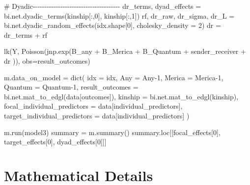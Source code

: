 \documentclass[
  letterpaper,
  DIV=11,
  numbers=noendperiod]{scrreprt}
\newenvironment{Shaded}{\begin{snugshade}}{\end{snugshade}}
\newcommand{\BuiltInTok}[1]{\textcolor[rgb]{0.00,0.23,0.31}{#1}}
\newcommand{\CommentTok}[1]{\textcolor[rgb]{0.37,0.37,0.37}{#1}}
\newcommand{\DecValTok}[1]{\textcolor[rgb]{0.68,0.00,0.00}{#1}}
\newcommand{\NormalTok}[1]{\textcolor[rgb]{0.00,0.23,0.31}{#1}}
\newcommand{\OperatorTok}[1]{\textcolor[rgb]{0.37,0.37,0.37}{#1}}
\newcommand{\StringTok}[1]{\textcolor[rgb]{0.13,0.47,0.30}{#1}}
\begin{document}
\begin{Shaded}
\begin{Highlighting}[]
    \CommentTok{\# Dyadic{-}{-}{-}{-}{-}{-}{-}{-}{-}{-}{-}{-}{-}{-}{-}{-}{-}{-}{-}{-}{-}{-}{-}{-}{-}{-}{-}{-}{-}{-}{-}{-}{-}{-}{-}{-}{-}{-}  }
\NormalTok{    dr\_terms, dyad\_effects }\OperatorTok{=}\NormalTok{ bi.net.dyadic\_terms(kinship[:,}\DecValTok{0}\NormalTok{], kinship[:,}\DecValTok{1}\NormalTok{])}
\NormalTok{    rf, dr\_raw, dr\_sigma, dr\_L }\OperatorTok{=}\NormalTok{ bi.net.dyadic\_random\_effects(idx.shape[}\DecValTok{0}\NormalTok{], cholesky\_density }\OperatorTok{=} \DecValTok{2}\NormalTok{)}
\NormalTok{    dr }\OperatorTok{=}\NormalTok{ dr\_terms }\OperatorTok{+}\NormalTok{ rf}

\NormalTok{    lk(}\StringTok{\textquotesingle{}Y\textquotesingle{}}\NormalTok{, Poisson(jnp.exp(B\_any }\OperatorTok{+}\NormalTok{ B\_Merica }\OperatorTok{+}\NormalTok{ B\_Quantum }\OperatorTok{+}\NormalTok{ sender\_receiver }\OperatorTok{+}\NormalTok{ dr )), obs}\OperatorTok{=}\NormalTok{result\_outcomes)}

\NormalTok{m.data\_on\_model }\OperatorTok{=} \BuiltInTok{dict}\NormalTok{(}
\NormalTok{    idx }\OperatorTok{=}\NormalTok{ idx,}
\NormalTok{    Any }\OperatorTok{=}\NormalTok{ Any}\OperatorTok{{-}}\DecValTok{1}\NormalTok{, }
\NormalTok{    Merica }\OperatorTok{=}\NormalTok{ Merica}\OperatorTok{{-}}\DecValTok{1}\NormalTok{, }
\NormalTok{    Quantum }\OperatorTok{=}\NormalTok{ Quantum}\OperatorTok{{-}}\DecValTok{1}\NormalTok{,}
\NormalTok{    result\_outcomes }\OperatorTok{=}\NormalTok{ bi.net.mat\_to\_edgl(data[}\StringTok{\textquotesingle{}outcomes\textquotesingle{}}\NormalTok{]), }
\NormalTok{    kinship }\OperatorTok{=}\NormalTok{ bi.net.mat\_to\_edgl(kinship),}
\NormalTok{    focal\_individual\_predictors }\OperatorTok{=}\NormalTok{ data[}\StringTok{\textquotesingle{}individual\_predictors\textquotesingle{}}\NormalTok{],}
\NormalTok{    target\_individual\_predictors }\OperatorTok{=}\NormalTok{ data[}\StringTok{\textquotesingle{}individual\_predictors\textquotesingle{}}\NormalTok{]}
\NormalTok{)}

\NormalTok{m.run(model3) }
\NormalTok{summary }\OperatorTok{=}\NormalTok{ m.summary()}
\NormalTok{summary.loc[[}\StringTok{\textquotesingle{}focal\_effects[0]\textquotesingle{}}\NormalTok{, }\StringTok{\textquotesingle{}target\_effects[0]\textquotesingle{}}\NormalTok{, }\StringTok{\textquotesingle{}dyad\_effects[0]\textquotesingle{}}\NormalTok{]]}
\end{Highlighting}
\end{Shaded}

\section{Mathematical Details}\label{mathematical-details-19}
\end{document}
